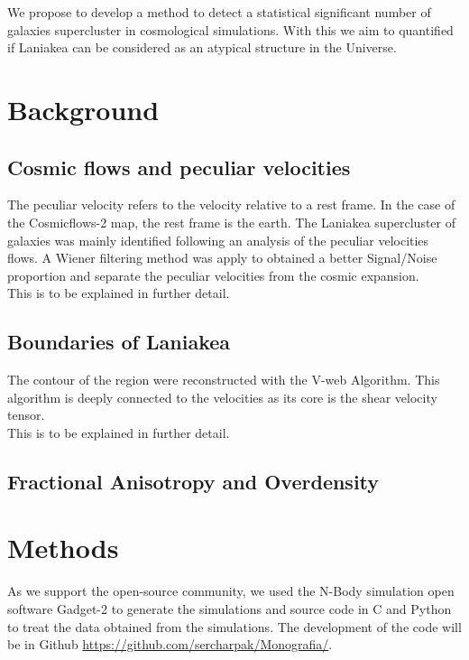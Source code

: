 \documentclass[12pt]{article}
\begin{document}
We propose to develop a method to detect a statistical significant number of galaxies
supercluster in cosmological simulations. 
With this we aim to quantified if Laniakea can be considered as an atypical structure in
the Universe. 
\\

\section{Background}
\subsection{Cosmic flows and peculiar velocities}
The peculiar velocity refers to the velocity relative to a rest frame. In the case of the
Cosmicflows-2 map, the rest frame is the earth. 
The Laniakea supercluster of galaxies was mainly identified following an analysis of the
peculiar velocities flows. A Wiener filtering method was apply to obtained a better
Signal/Noise proportion and separate the peculiar velocities from the cosmic expansion.\\
This is to be explained in further detail.



\subsection{Boundaries of Laniakea}
The contour of the region were reconstructed with the V-web Algorithm. This algorithm is deeply connected to the velocities as its core is the shear velocity tensor.\\

This is to be explained in further detail.

\subsection{Fractional Anisotropy and Overdensity}

\section{Methods}

As we support the open-source community, we used the N-Body simulation open
software Gadget-2 \cite{springel_gadget_2_2005} to generate the simulations
and source code in C and Python to treat the data obtained from the
simulations. The development of the code will be in Github \url{https://github.com/sercharpak/Monografia/}.
\end{document}
